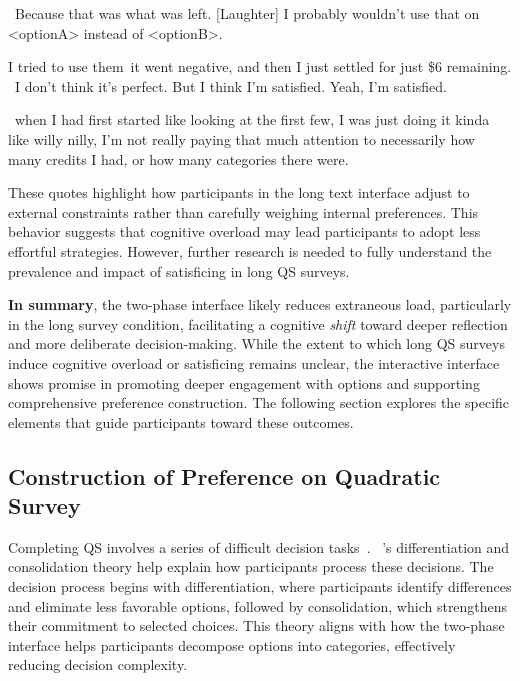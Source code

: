 \begin{displayquote}
    ~\bracketellipsis Because that was what was left. [Laughter] I probably wouldn't use that on <optionA> instead of <optionB>.~\bracketellipsis \hfill{}

    I tried to use them~\bracketellipsis it went negative, and then I just settled for just \$6 remaining. ~\bracketellipsis I don't think it's perfect. But I think I'm satisfied. Yeah, I'm satisfied.  \hfill{}

    ~\bracketellipsis when I had first started like looking at the first few, I was just doing it kinda like willy nilly, I'm not really paying that much attention to necessarily how many credits I had, or how many categories there were. \hfill{}
\end{displayquote}

These quotes highlight how participants in the long text interface adjust to external constraints rather than carefully weighing internal preferences. This behavior suggests that cognitive overload may lead participants to adopt less effortful strategies. However, further research is needed to fully understand the prevalence and impact of satisficing in long QS surveys.  

\textbf{In summary}, the two-phase interface likely reduces extraneous load, particularly in the long survey condition, facilitating a cognitive \textit{shift} toward deeper reflection and more deliberate decision-making. While the extent to which long QS surveys induce cognitive overload or satisficing remains unclear, the interactive interface shows promise in promoting deeper engagement with options and supporting comprehensive preference construction. The following section explores the specific elements that guide participants toward these outcomes.

\subsection{Construction of Preference on Quadratic Survey}

Completing QS involves a series of difficult decision tasks~\textcite{lichtensteinConstructionPreference2006}. ~\textcite{svensonDifferentiationConsolidationTheory1992}'s differentiation and consolidation theory help explain how participants process these decisions. The decision process begins with differentiation, where participants identify differences and eliminate less favorable options, followed by consolidation, which strengthens their commitment to selected choices. This theory aligns with how the two-phase interface helps participants decompose options into categories, effectively reducing decision complexity.

